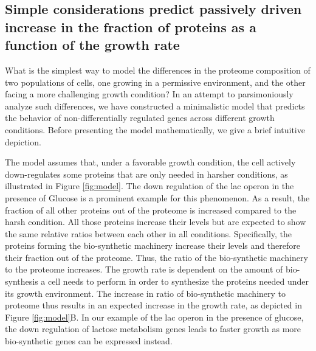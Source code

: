 \subsection{Simple considerations predict passively driven increase in the fraction of proteins as a function of the growth rate}
What is the simplest way to model the differences in the proteome composition of two populations of cells, one growing in a permissive environment, and the other facing a more challenging growth condition?
In an attempt to parsimoniously analyze such differences, we have constructed a minimalistic model that predicts the behavior of non-differentially regulated genes across different growth conditions.
Before presenting the model mathematically, we give a brief intuitive depiction.

The model assumes that, under a favorable growth condition, the cell actively down-regulates some proteins that are only needed in harsher conditions, as illustrated in Figure \ref{fig:model}.
The down regulation of the lac operon in the presence of Glucose is a prominent example for this phenomenon. 
As a result, the fraction of all other proteins out of the proteome is increased compared to the harsh condition.
All those proteins increase their levels but are expected to show the same relative ratios between each other in all conditions. 
Specifically, the proteins forming the bio-synthetic machinery increase their levels and therefore their fraction out of the proteome.
Thus, the ratio of the bio-synthetic machinery to the proteome increases.
The growth rate is dependent on the amount of bio-synthesis a cell needs to perform in order to synthesize the proteins needed under its growth environment.
The increase in ratio of bio-synthetic machinery to proteome thus results in an expected increase in the growth rate, as  depicted in Figure \ref{fig:model}B.
In our example of the lac operon in the presence of glucose, the down regulation of lactose metabolism genes leads to faster growth as more bio-synthetic genes can be expressed instead.